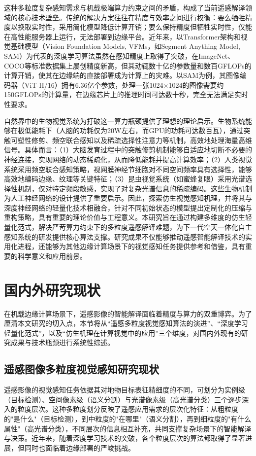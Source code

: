 这种多粒度复杂感知需求与机载极端算力约束之间的矛盾，构成了当前遥感解译领域的核心技术壁垒。传统的解决方案往往在精度与效率之间进行权衡：要么牺牲精度以换取实时性，采用简化模型降低计算开销；要么保持精度但牺牲实时性，仅能在高性能服务器上运行，无法部署到边缘平台。近年来，以Transformer架构\cite{dosovitskiy2021image}和视觉基础模型（Vision Foundation Models, VFMs，如Segment Anything Model, SAM\cite{kirillov2023segment}）为代表的深度学习算法虽然在感知精度上取得了突破，在ImageNet\cite{russakovsky2014imagenet}、COCO等标准数据集上屡创精度新高，但其动辄数十亿的参数量和数百GFLOPs的计算开销，使其在边缘端的直接部署成为计算上的灾难。以SAM为例，其图像编码器（ViT-H/16）拥有6.36亿个参数，处理一张1024×1024的图像需要约150GFLOPs的计算量，在边缘芯片上的推理时间可达数十秒，完全无法满足实时性要求。

自然界中的生物视觉系统为打破这一算力瓶颈提供了理想的理论启示。生物系统能够在极低能耗下（人脑的功耗仅为20W左右，而GPU的功耗可达数百瓦），通过突触可塑性修剪、频空联合感知以及稀疏选择性注意力等机制，高效地处理海量高维信号\cite{higgins2023towards}。具体而言：（1）大脑发育过程中的突触修剪机制能够自适应地切断不必要的神经连接，实现网络的动态稀疏化，从而降低能耗并提高计算效率；（2）人类视觉系统采用频空联合感知策略，视网膜神经节细胞对不同空间频率具有选择性，能够高效地编码边缘、纹理等关键特征\cite{serre2007robust}；（3）昆虫视觉系统（如蜜蜂复眼）采用光谱选择性机制，仅对特定频段敏感，实现了对复杂光谱信息的稀疏编码。这些生物机制为人工神经网络的设计提供了重要启示。因此，探索仿生视觉感知机理，并将其与深度神经网络的轻量化技术相融合，针对不同初始状态的模型提出定制化的压缩与重构策略，具有重要的理论价值与工程意义。本研究旨在通过构建多维度的仿生轻量化范式，解决严苛算力约束下的多粒度遥感解译难题，为下一代空天一体化自主感知系统的研发提供核心算法支撑。研究成果不仅能够推动遥感智能解译技术的实用化进程，还能够为其他边缘计算场景下的视觉感知任务提供参考和借鉴，具有重要的科学意义和应用前景。

\section{国内外研究现状}
在机载边缘计算场景下，遥感影像的智能解译面临着精度与算力的双重博弈。为了厘清本文研究的切入点，本节将从“遥感多粒度视觉感知算法的演进”、“深度学习轻量化范式”，以及“仿生机理在计算视觉中的应用”三个维度，对国内外现有的研究成果与技术瓶颈进行系统性综述。
\subsection{遥感图像多粒度视觉感知研究现状}
遥感影像的视觉感知任务依据其对地物目标表征精细度的不同，可划分为实例级（目标检测）、空间像素级（语义分割）与光谱像素级（高光谱分类）三个逐步深入的粒度层次。这种多粒度划分反映了遥感应用需求的层次化特征：从粗粒度的"是什么"（目标检测），到中粒度的"在哪里"（语义分割），再到细粒度的"有什么属性"（高光谱分类），不同层次的信息相互补充，共同支撑复杂场景下的智能解译与决策。近年来，随着深度学习技术的突破，各个粒度层次的算法都取得了显著进展，但同时也面临着边缘部署的严峻挑战。

